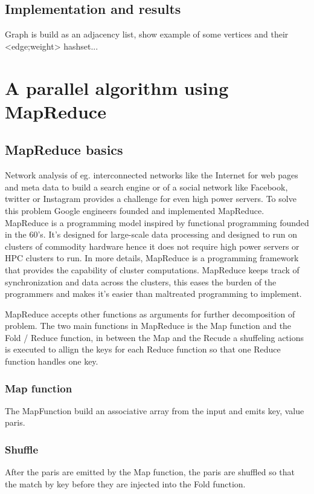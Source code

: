 \documentclass{article}
\begin{document}
\subsection{Implementation and results}
Graph is build as an adjacency list, show example of some vertices and their <edge;weight> hashset...

\section{A parallel algorithm using MapReduce}

\subsection{MapReduce basics}
Network analysis of eg. interconnected networks like the Internet for web pages and meta data to build a search engine or of a social network like Facebook, twitter or Instagram provides a challenge for even high power servers. To solve this problem Google engineers founded and implemented MapReduce. MapReduce is a programming model inspired by functional programming founded in the 60's. It's designed for large-scale data processing and designed to run on clusters of commodity hardware hence it does not require high power servers or HPC clusters to run.
In more details, MapReduce is a programming framework that provides the capability of cluster computations. MapReduce keeps track of synchronization and data across the clusters, this eases the burden of the programmers and makes it's easier than maltreated programming to implement.

\noindent MapReduce accepts other functions as arguments for further decomposition of problem. The two main functions in MapReduce is the Map function and the Fold / Reduce function, in between the Map and the Recude a shuffeling actions is executed to allign the keys for each Reduce function so that one Reduce function handles one key.



\subsubsection{Map function}
The MapFunction build an associative array from the input and emits key, value paris.



\subsubsection{Shuffle}
After the paris are emitted by the Map function, the paris are shuffled so that the match by key before they are injected into the Fold function.
\end{document}
